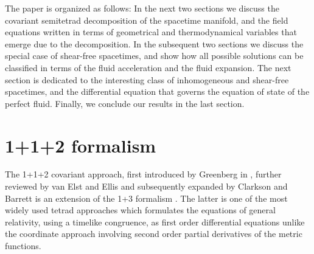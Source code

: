 \documentclass[abstract=on,notitlepage,superscriptaddress,nofootinbib,aps,showpacs,twocolumn,prd]{revtex4}
\newcommand{\0}{^{(0)}}
\newcommand{\1}{^{(1)}}
\newcommand{\2}{^{(2)}}
\newcommand{\3}{{}^{(3)}}
\begin{document}
The paper is organized as follows: In the next two sections we discuss the covariant semitetrad decomposition of the spacetime manifold, and the field equations written in terms of geometrical and thermodynamical variables that emerge due to the decomposition. In the subsequent two sections we discuss the special case of shear-free spacetimes, and show how all possible solutions can be classified in terms of the fluid acceleration and the fluid expansion. The next section is dedicated to the interesting class of inhomogeneous and shear-free spacetimes, and the differential equation that governs the equation of state of the perfect fluid. Finally, we conclude our results in the last section. 


\section{1+1+2 formalism} \label{formalism}

The 1+1+2 covariant approach, first introduced by Greenberg in \cite{greenberg}, further reviewed by van Elst and Ellis  \cite{vanElstEllis}  and subsequently expanded by Clarkson and Barrett  \cite{clarksonbarrett, clarkson2007} is an extension of the 1+3 formalism \cite{ehlers, ellis1+3}. The latter is one of the most widely used tetrad approaches which formulates the equations of general relativity, using a timelike congruence, as first order differential equations unlike the coordinate approach involving second order partial derivatives of the metric functions. 
\end{document}
